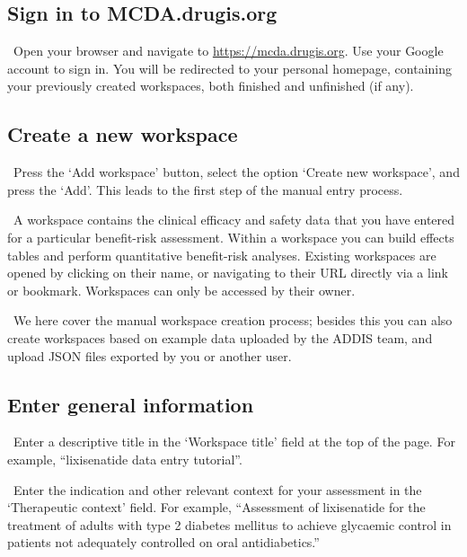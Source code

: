\documentclass[00_mcda_tutorial.tex]{subfiles}
\begin{document}
\subsection*{Sign in to MCDA.drugis.org}
\leftpointright \, Open your browser and navigate to \href{https://mcda.drugis.org}{https://mcda.drugis.org}. Use your Google account to sign in. You will be redirected to your personal homepage, containing your previously created workspaces, both finished and unfinished (if any).

\subsection*{Create a new workspace}
\leftpointright \, Press the ‘Add workspace’ button, select the option ‘Create new workspace’, and press the ‘Add’. This leads to the first step of the manual entry process.
\newline

\noindent \faGraduationCap \, A workspace contains the clinical efficacy and safety data that you have entered for a particular benefit-risk assessment. Within a workspace you can build effects tables and perform quantitative benefit-risk analyses. Existing workspaces are opened by clicking on their name, or navigating to their URL directly via a link or bookmark. Workspaces can only be accessed by their owner.
\newline

\noindent \faLightbulbO \, We here cover the manual workspace creation process; besides this you can also create workspaces based on example data uploaded by the ADDIS team, and upload JSON files exported by you or another user.

\subsection*{Enter general information}
\noindent \leftpointright \, Enter a descriptive title in the ‘Workspace title’ field at the top of the page. For example, “lixisenatide data entry tutorial”. 
\newline

\noindent \leftpointright \, Enter the indication and other relevant context for your assessment in the ‘Therapeutic context’ field. For example, “Assessment of lixisenatide for the treatment of adults with type 2 diabetes mellitus to achieve glycaemic control in patients not adequately controlled on oral antidiabetics.”
\newline
\end{document}
